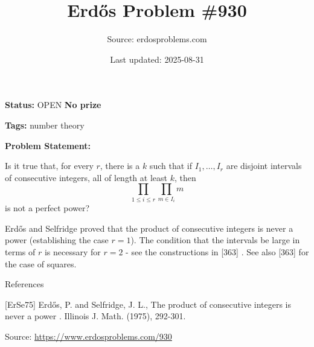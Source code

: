 \documentclass{article}
\title{Erd\H{o}s Problem \#930}
\date{Last updated: 2025-08-31}
\author{Source: erdosproblems.com}
\begin{document}
\maketitle

\noindent\textbf{Status:} OPEN \quad \textbf{No prize}

\noindent\textbf{Tags:} number theory

\medskip

\noindent\textbf{Problem Statement:}

Is it true that, for every $r$, there is a $k$ such that if $I_1,\ldots,I_r$ are disjoint intervals of consecutive integers, all of length at least $k$, then\[\prod_{1\leq i\leq r}\prod_{m\in I_i}m\]is not a perfect power?




Erd\H{o}s and Selfridge \cite{ErSe75} proved that the product of consecutive integers is never a power (establishing the case $r=1$). The condition that the intervals be large in terms of $r$ is necessary for $r=2$ - see the constructions in [363] . See also [363] for the case of squares.




References

[ErSe75] Erd\H{o}s, P. and Selfridge, J. L., The product of consecutive integers is never a power . Illinois J. Math. (1975), 292-301.


\bigskip
\noindent\small{Source: \url{https://www.erdosproblems.com/930}}
\end{document}

